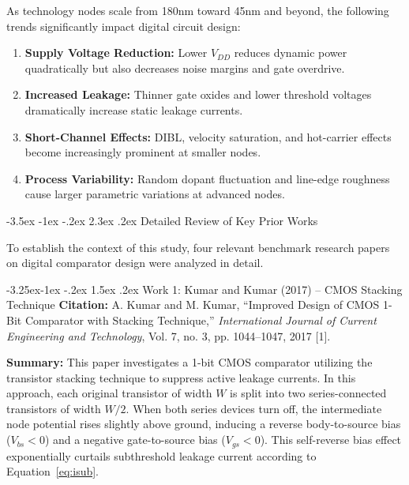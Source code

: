 \documentclass[12pt,a4paper,oneside]{report}
\makeatletter
\renewcommand\section{\@startsection {section}{1}{\z@}%
                                   {-3.5ex \@plus -1ex \@minus -.2ex}%
                                   {2.3ex \@plus.2ex}%
                                   {\normalfont\normalsize\bfseries}}
\renewcommand\subsection{\@startsection{subsection}{2}{\z@}%
                                     {-3.25ex\@plus -1ex \@minus -.2ex}%
                                     {1.5ex \@plus .2ex}%
                                     {\normalfont\normalsize\bfseries\itshape}}
\makeatother
\begin{document}
As technology nodes scale from 180nm toward 45nm and beyond, the following trends significantly impact digital circuit design:
\begin{enumerate}
\item \textbf{Supply Voltage Reduction:} Lower $V_{DD}$ reduces dynamic power quadratically but also decreases noise margins and gate overdrive.
\item \textbf{Increased Leakage:} Thinner gate oxides and lower threshold voltages dramatically increase static leakage currents.
\item \textbf{Short-Channel Effects:} DIBL, velocity saturation, and hot-carrier effects become increasingly prominent at smaller nodes.
\item \textbf{Process Variability:} Random dopant fluctuation and line-edge roughness cause larger parametric variations at advanced nodes.
\end{enumerate}

\section{Detailed Review of Key Prior Works}

To establish the context of this study, four relevant benchmark research papers on digital comparator design were analyzed in detail.

\subsection{Work 1: Kumar and Kumar (2017) -- CMOS Stacking Technique}
\textbf{Citation:} A. Kumar and M. Kumar, ``Improved Design of CMOS 1-Bit Comparator with Stacking Technique,'' \textit{International Journal of Current Engineering and Technology}, Vol. 7, no. 3, pp. 1044--1047, 2017 [1].

\noindent\textbf{Summary:} This paper investigates a 1-bit CMOS comparator utilizing the transistor stacking technique to suppress active leakage currents. In this approach, each original transistor of width $W$ is split into two series-connected transistors of width $W/2$. When both series devices turn off, the intermediate node potential rises slightly above ground, inducing a reverse body-to-source bias ($V_{bs} < 0$) and a negative gate-to-source bias ($V_{gs} < 0$). This self-reverse bias effect exponentially curtails subthreshold leakage current according to Equation~\ref{eq:isub}.
\end{document}
